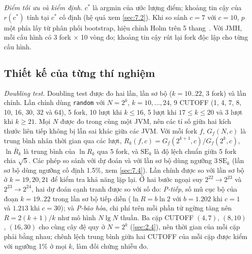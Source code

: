 \documentclass[12pt,a4paper]{article}
\begin{document}
\emph{Điểm tối ưu và kiểm định.} $c^*$ là argmin của ước lượng điểm; khoảng tin cậy của $r(c^*)$ tính tại $c^*$ cố định (hệ quả xem \cref{sec:7.2}). Khi so sánh $c = 7$ với $c = 10$, $p$ một phía lấy từ phân phối bootstrap, hiệu chỉnh Holm trên 5 thang~\citep{holm1979}. Với JMH, mỗi cấu hình có 3 fork $\times$ 10 vòng đo; khoảng tin cậy rút lại fork độc lập cho từng cấu hình.

\subsection{Thiết kế của từng thí nghiệm}\label{sec:4.6}\label{sec:4.7}\label{sec:4.8}\label{sec:4.9}\label{sec:4.10}
\emph{Doubling test.} Doubling test được đo hai lần, lần sơ bộ ($k = 10..22$, 3 fork) và lần chính. Lần chính dùng \texttt{random} với $N = 2^k$, $k = 10, \dots, 24$, 9 CUTOFF (1, 4, 7, 8, 10, 16, 30, 32 và 64), 5 fork, 10 lượt khi $k \le 16$, 5 lượt khi $17 \le k \le 20$ và 3 lượt khi $k \ge 21$. Mọi $N$ được đo trong cùng một JVM, nên các tỉ số giữa hai kích thước liên tiếp không bị lẫn sai khác giữa các JVM. Với mỗi fork $f$, $G_f(N,c)$ là trung bình nhân thời gian qua các lượt, $R_k(f,c) = G_f(2^{k+1},c)/G_f(2^k,c)$, $\ln \bar R_k$ là trung bình của $\ln R_k$ qua 5 fork, và $\mathrm{SE}_k$ là độ lệch chuẩn giữa 5 fork chia $\sqrt 5$. Các phép so sánh với dự đoán và với lần sơ bộ dùng ngưỡng $3\,\mathrm{SE}_k$ (lần sơ bộ dùng ngưỡng cố định 1.5\%, xem \cref{sec:7.4}). Lần chính được so với lần sơ bộ ở $k = 19, 20, 21$ để kiểm tra khả năng lặp lại. Ở hai bước ngoại suy $2^{22} \to 2^{23}$ và $2^{23} \to 2^{24}$, hai dự đoán cạnh tranh được so với số đo: \emph{P-tiếp}, số mũ cục bộ của đoạn $k = 19..22$ trong lần sơ bộ tiếp diễn ($\ln R = b \ln 2$ với $b = 1.202$ khi $c = 1$ và $1.213$ khi $c = 30$); và \emph{P-bão hòa}, chi phí trên mỗi phần tử ngừng tăng nên $R = 2(k+1)/k$ như mô hình $N \lg N$ thuần. Ba cặp CUTOFF $(4,7)$, $(8,10)$, $(16,30)$ cho cùng cây đệ quy ở $N = 2^k$ (\cref{sec:2.4}), nên thời gian của mỗi cặp phải bằng nhau; chênh lệch trung bình giữa hai CUTOFF của mỗi cặp được kiểm với ngưỡng 1\% ở mọi $k$, làm đối chứng nhiễu đo.
\end{document}
